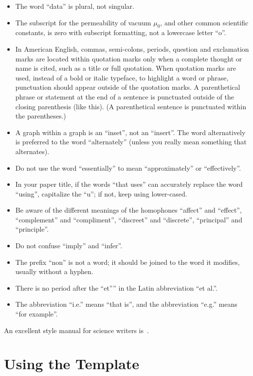 \documentclass [a4paper,final,conference,10pt]{IDAACS}
\begin{document}
\begin{itemize}
\item {The word ``data'' is plural, not singular.}
\item {The subscript for the permeability of vacuum $\mu_0$, and other 
common scientific constants, is zero with subscript formatting, not a 
lowercase letter ``o''.}
\item {In American English, commas, semi-colons, periods, question and
exclamation marks are located within quotation marks only when a complete
thought or name is cited, such as a title or full quotation. When quotation
marks are used, instead of a bold or italic typeface, to highlight a word 
or phrase, punctuation should appear outside of the quotation marks. 
A parenthetical phrase or statement at the end of a sentence is punctuated 
outside of the closing parenthesis (like this). (A parenthetical sentence 
is punctuated within the parentheses.)}
\item{A graph within a graph is an ``inset'', not an ``insert''. The word 
alternatively is preferred to the word ``alternately'' (unless you really 
mean something that alternates).}
\item{Do not use the word ``essentially'' to mean ``approximately'' or 
``effectively''.}
\item{In your paper title, if the words ``that uses'' can accurately replace 
the word ``using'', capitalize the ``u''; if not, keep using lower-cased.}
\item{Be aware of the different meanings of the homophones ``affect'' and 
``effect'', ``complement'' and ``compliment'', ``discreet'' and ``discrete'',
``principal'' and ``principle''.}
\item{Do not confuse ``imply'' and ``infer''.}
\item{The prefix ``non'' is not a word; it should be joined to the word it 
modifies, usually without a hyphen.}
\item{There is no period after the ``et''” in the Latin abbreviation 
``et al.''.}
\item{The abbreviation ``i.e.'' means ``that is'', and the abbreviation 
``e.g.'' means ``for example''.}
\end{itemize}

An excellent style manual for science writers is~\cite{publ7}.

\section{Using the Template}
\end{document}
